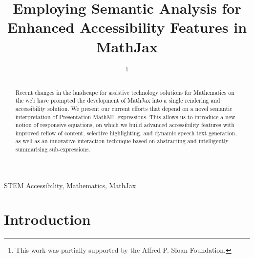 \documentclass[conference]{IEEEtran}
\begin{document}
\title{Employing Semantic Analysis for Enhanced Accessibility Features in
  MathJax}

\author{
  \and
  \and  {}
  \thanks{This work was partially supported by the Alfred P. Sloan Foundation.}
}


\maketitle

\begin{abstract}
  Recent changes in the landscape for assistive technology solutions for
  Mathematics on the web have prompted the development of MathJax into a single
  rendering and accessibility solution. We present our current efforts that
  depend on a novel semantic interpretation of Presentation MathML
  expressions. This allows us to introduce a new notion of responsive equations,
  on which we build advanced accessibility features with improved reflow of
  content, selective highlighting, and dynamic speech text generation, as well as
  an innovative interaction technique based on abstracting and intelligently
  summarising sub-expressions.
\end{abstract}
\IEEEpeerreviewmaketitle

\begin{IEEEkeywords}
  STEM Accessibility, Mathematics, MathJax
\end{IEEEkeywords}

\section{Introduction}
\end{document}
